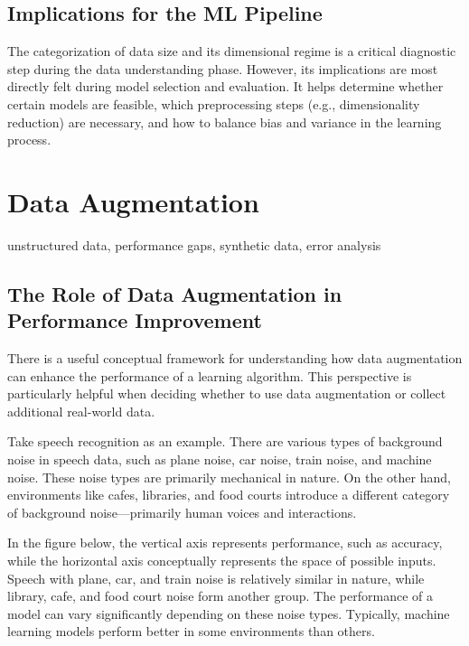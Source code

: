 \documentclass[12pt,openany, draft]{book}
\begin{document}
\subsection{Implications for the ML Pipeline}

The categorization of data size and its dimensional regime is a critical diagnostic step during the data understanding phase. However, its implications are most directly felt during model selection and evaluation. It helps determine whether certain models are feasible, which preprocessing steps (e.g., dimensionality reduction) are necessary, and how to balance bias and variance in the learning process.



\section{Data Augmentation}

\begin{keywordsbox}
unstructured data, performance gaps, synthetic data, error analysis
\end{keywordsbox}

\subsection{The Role of Data Augmentation in Performance Improvement}

There is a useful conceptual framework for understanding how data augmentation can enhance the performance of a learning algorithm. This perspective is particularly helpful when deciding whether to use data augmentation or collect additional real-world data. 
\newline

Take speech recognition as an example. There are various types of background noise in speech data, such as plane noise, car noise, train noise, and machine noise. These noise types are primarily mechanical in nature. On the other hand, environments like cafes, libraries, and food courts introduce a different category of background noise—primarily human voices and interactions. 
\newline

In the figure below, the vertical axis represents performance, such as accuracy, while the horizontal axis conceptually represents the space of possible inputs. Speech with plane, car, and train noise is relatively similar in nature, while library, cafe, and food court noise form another group. The performance of a model can vary significantly depending on these noise types. Typically, machine learning models perform better in some environments than others. 
\newline
\end{document}
